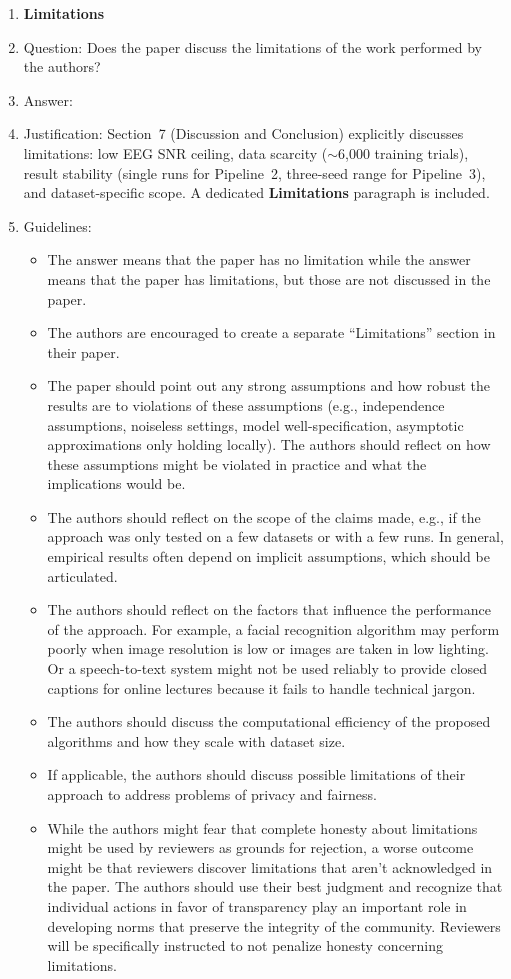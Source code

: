 \documentclass{article}
\begin{document}
\begin{enumerate}
\item {\bf Limitations}
    \item[] Question: Does the paper discuss the limitations of the work performed by the authors?
    \item[] Answer: \answerYes{}
    \item[] Justification: Section~7 (Discussion and Conclusion) explicitly discusses limitations: low EEG SNR ceiling, data scarcity ($\sim$6,000 training trials), result stability (single runs for Pipeline~2, three-seed range for Pipeline~3), and dataset-specific scope. A dedicated \textbf{Limitations} paragraph is included.
    \item[] Guidelines:
    \begin{itemize}
        \item The answer \answerNA{} means that the paper has no limitation while the answer \answerNo{} means that the paper has limitations, but those are not discussed in the paper.
        \item The authors are encouraged to create a separate ``Limitations'' section in their paper.
        \item The paper should point out any strong assumptions and how robust the results are to violations of these assumptions (e.g., independence assumptions, noiseless settings, model well-specification, asymptotic approximations only holding locally). The authors should reflect on how these assumptions might be violated in practice and what the implications would be.
        \item The authors should reflect on the scope of the claims made, e.g., if the approach was only tested on a few datasets or with a few runs. In general, empirical results often depend on implicit assumptions, which should be articulated.
        \item The authors should reflect on the factors that influence the performance of the approach. For example, a facial recognition algorithm may perform poorly when image resolution is low or images are taken in low lighting. Or a speech-to-text system might not be used reliably to provide closed captions for online lectures because it fails to handle technical jargon.
        \item The authors should discuss the computational efficiency of the proposed algorithms and how they scale with dataset size.
        \item If applicable, the authors should discuss possible limitations of their approach to address problems of privacy and fairness.
        \item While the authors might fear that complete honesty about limitations might be used by reviewers as grounds for rejection, a worse outcome might be that reviewers discover limitations that aren't acknowledged in the paper. The authors should use their best judgment and recognize that individual actions in favor of transparency play an important role in developing norms that preserve the integrity of the community. Reviewers will be specifically instructed to not penalize honesty concerning limitations.
    \end{itemize}


\end{enumerate}
\end{document}
